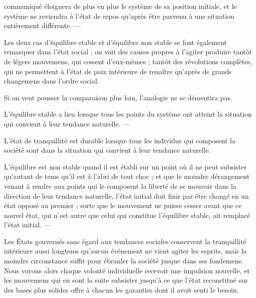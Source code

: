\documentclass[11pt,a4paper]{article}
\begin{document}
communiqué éloignera de plus en plus le système de sa position initiale, et
 le système ne reviendra à l'état \ill{} de repos  qu'après être parvenu à une situation entièrement
différente. ---

Les deux cas d'équilibre stable et d'équilibre non stable se font également
remarquer dans l'état social ; on voit des causes propres à l'agiter
produire tantôt de légers mouvemens, qui cessent d'eux-mêmes ; tantôt des
révolutions complètes,  qui ne permettent à l'état de
paix intérieure de renaître  qu'après de grands
changemens dans l'ordre social.

Si on veut pousser la comparaison plus loin, l'analogie ne se démentira pas.

L'équilibre stable a lieu lorsque tous les points du système ont atteint la
situation qui convient à leur tendance naturelle. ---

L'état de tranquillité est durable lorsque tous les individus qui composent
la société sont dans la situation qui convient à leur tendance naturelle.

L'équilibre est non stable  quand il est établi sur un
point où il ne peut subsister qu'autant de tems qu'il est à l'abri de tout
choc ;  et \struck{\ill{}} que  le
 moindre  dérangement venant à rendre aux
points qui le composent la liberté de se mouvoir dans la direction de leur
tendance naturelle, l'état initial doit finir par être changé en un état
opposé au premier ;   sorte que le mouvement
ne  puisse cesser avant que ce nouvel état, qui n'est autre que
celui  qui constitue l'équilibre stable,
 ait remplacé l'état initial. ---

Les États gouvernés sans égard aux tendances sociales conservent la
tranquillité intérieure aussi longtems qu'aucun événement ne vient agiter les
esprits, mais la moindre circonstance suffit pour  ébranler la
société jusque dans ses fondemens. Nous voyons alors chaque volonté
individuelle recevoir une impulsion nouvelle, et les mouvemens qui en sont
la suite subsister jusqu'à ce que l'état reconstitué sur des bases
\struck{\ill{}} plus solides offre à chacun les garanties dont il avoit senti
le besoin.
\end{document}
